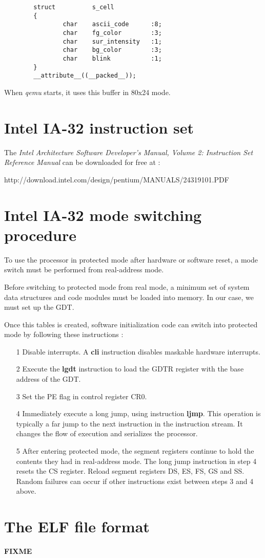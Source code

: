 \begin{verbatim}
        struct          s_cell
        {
                char    ascii_code      :8;
                char    fg_color        :3;
                char    sur_intensity   :1;
                char    bg_color        :3;
                char    blink           :1;
        }
        __attribute__((__packed__));
\end{verbatim}

When \emph{qemu} starts, it uses this buffer in 80x24 mode.

%
%

\newpage
\section{Intel IA-32 instruction set}

The  \emph{Intel Architecture Software Developer's Manual, Volume 2:
Instruction Set Reference Manual} can be downloaded for free at :

http://download.intel.com/design/pentium/MANUALS/24319101.PDF

\section{Intel IA-32 mode switching procedure}

To use the processor in protected mode after hardware or software reset, a mode
switch must be performed from real-address mode.

Before switching to protected mode from real mode, a minimum set of system data
structures and code modules must be loaded into memory. In our case, we must
set up the GDT.

Once this tables is created, software initialization code can switch into
protected mode by following these instructions :
\begin{itemize}
  \item[1] Disable interrupts. A \textbf{cli} instruction disables maskable
    hardware interrupts.
  \item[2] Execute the \textbf{lgdt} instruction to load the GDTR register
    with the base address of the GDT.
  \item[3] Set the PE flag in control register CR0.
  \item[4] Immediately execute a long jump, using instruction \textbf{ljmp}.
    This operation is typically a far jump to the next instruction in the
    instruction stream. It changes the flow of execution and serializes the
    processor.
  \item[5] After entering protected mode, the segment registers continue to
    hold the contents they had in real-address mode. The long jump instruction
    in step 4 resets the CS register. Reload segment registers DS, ES, FS, GS
    and SS. Random failures can occur if other instructions exist between
    steps 3 and 4 above.
\end{itemize}

%
%

\newpage
\section{The ELF file format}
\textbf{FIXME}
